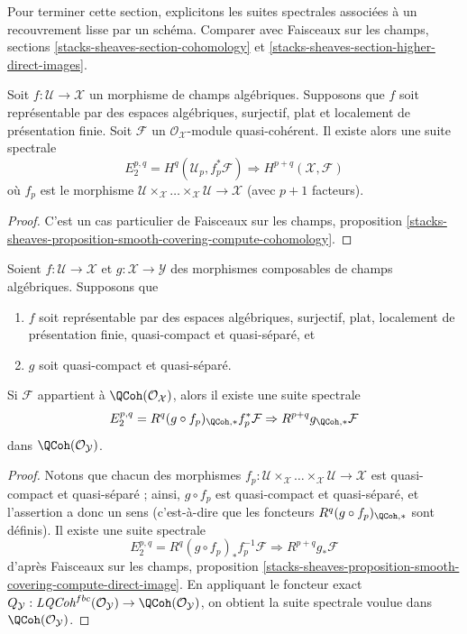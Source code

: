 \noindent
Pour terminer cette section, explicitons les suites spectrales
associées à un recouvrement lisse par un schéma. Comparer avec
Faisceaux sur les champs, sections \ref{stacks-sheaves-section-cohomology} et
\ref{stacks-sheaves-section-higher-direct-images}.

\begin{proposition}
\label{proposition-smooth-covering-compute-cohomology}
Soit $f : \mathcal{U} \to \mathcal{X}$ un morphisme de champs algébriques.
Supposons que $f$ soit représentable par des espaces algébriques, surjectif, plat et
localement de présentation finie. Soit $\mathcal{F}$ un
$\mathcal{O}_\mathcal{X}$-module quasi-cohérent. Il existe alors une suite spectrale
$$
E_2^{p, q} = H^q(\mathcal{U}_p, f_p^*\mathcal{F})
\Rightarrow
H^{p + q}(\mathcal{X}, \mathcal{F})
$$
où $f_p$ est le morphisme
$\mathcal{U} \times_\mathcal{X} \ldots \times_\mathcal{X} \mathcal{U} \to
\mathcal{X}$ (avec $p + 1$ facteurs).
\end{proposition}

\begin{proof}
C'est un cas particulier de
Faisceaux sur les champs, proposition
\ref{stacks-sheaves-proposition-smooth-covering-compute-cohomology}.
\end{proof}

\begin{proposition}
\label{proposition-smooth-covering-compute-direct-image}
Soient $f : \mathcal{U} \to \mathcal{X}$ et $g : \mathcal{X} \to \mathcal{Y}$
des morphismes composables de champs algébriques.
Supposons que
\begin{enumerate}
\item $f$ soit représentable par des espaces algébriques, surjectif,
plat, localement de présentation finie, quasi-compact et quasi-séparé, et
\item $g$ soit quasi-compact et quasi-séparé.
\end{enumerate}
Si $\mathcal{F}$ appartient à $\QCoh(\mathcal{O}_\mathcal{X})$, alors
il existe une suite spectrale
$$
E_2^{p, q} = R^q(g \circ f_p)_{\QCoh, *}f_p^*\mathcal{F}
\Rightarrow
R^{p + q}g_{\QCoh, *}\mathcal{F}
$$
dans $\QCoh(\mathcal{O}_\mathcal{Y})$.
\end{proposition}

\begin{proof}
Notons que chacun des morphismes
$f_p : \mathcal{U} \times_\mathcal{X} \ldots \times_\mathcal{X} \mathcal{U} \to
\mathcal{X}$ est quasi-compact et quasi-séparé ; ainsi, $g \circ f_p$
est quasi-compact et quasi-séparé, et l'assertion a donc un sens
(c'est-à-dire que les foncteurs $R^q(g \circ f_p)_{\QCoh, *}$ sont définis).
Il existe une suite spectrale
$$
E_2^{p, q} = R^q(g \circ f_p)_*f_p^{-1}\mathcal{F}
\Rightarrow
R^{p + q}g_*\mathcal{F}
$$
d'après Faisceaux sur les champs, proposition
\ref{stacks-sheaves-proposition-smooth-covering-compute-direct-image}.
En appliquant le foncteur exact
$Q_\mathcal{Y} : \textit{LQCoh}^{fbc}(\mathcal{O}_\mathcal{Y}) \to
\QCoh(\mathcal{O}_\mathcal{Y})$, on obtient la suite spectrale voulue dans
$\QCoh(\mathcal{O}_\mathcal{Y})$.
\end{proof}







